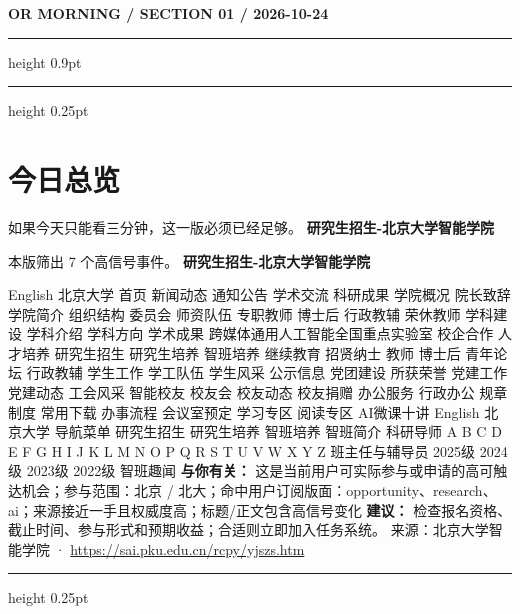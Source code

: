\documentclass[10.5pt]{ctexart}
\begin{document}
{\small\bfseries OR MORNING / SECTION 01 / 2026-10-24}
\vspace{2mm}
\hrule height 0.9pt
\vspace{1.5mm}
\hrule height 0.25pt
\vspace{4mm}
\section*{今日总览}
{\color{ormuted} 如果今天只能看三分钟，这一版必须已经足够。}
\vspace{2mm}
{\fontsize{25}{29}\selectfont\bfseries 研究生招生-北京大学智能学院}\par
\vspace{2mm}
{\large 本版筛出 7 个高信号事件。}
\vspace{3mm}
{\Large\bfseries 研究生招生-北京大学智能学院}\par
English 北京大学 首页 新闻动态 通知公告 学术交流 科研成果 学院概况 院长致辞 学院简介 组织结构 委员会 师资队伍 专职教师 博士后 行政教辅 荣休教师 学科建设 学科介绍 学科方向 学术成果 跨媒体通用人工智能全国重点实验室 校企合作 人才培养 研究生招生 研究生培养 智班培养 继续教育 招贤纳士 教师 博士后 青年论坛 行政教辅 学生工作 学工队伍 学生风采 公示信息 党团建设 所获荣誉 党建工作 党建动态 工会风采 智能校友 校友会 校友动态 校友捐赠 办公服务 行政办公 规章制度 常用下载 办事流程 会议室预定 学习专区 阅读专区 AI微课十讲 English 北京大学 导航菜单 研究生招生 研究生培养 智班培养 智班简介 科研导师 A B C D E F G H I J K L M N O P Q R S T U V W X Y Z 班主任与辅导员 2025级 2024级 2023级 2022级 智班趣闻
\textbf{与你有关：} 这是当前用户可实际参与或申请的高可触达机会；参与范围：北京 / 北大；命中用户订阅版面：opportunity、research、ai；来源接近一手且权威度高；标题/正文包含高信号变化
\textbf{建议：} 检查报名资格、截止时间、参与形式和预期收益；合适则立即加入任务系统。
{\footnotesize\color{ormuted} 来源：北京大学智能学院 · \url{https://sai.pku.edu.cn/rcpy/yjszs.htm}}
\vspace{3mm}
\hrule height 0.25pt
\vspace{3mm}
\end{document}
